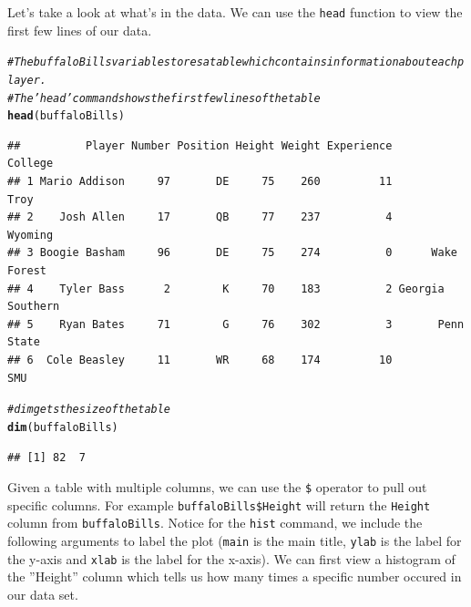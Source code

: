 \documentclass{article}\usepackage[]{graphicx}\usepackage[]{color}
\makeatletter
\newcommand{\hlcom}[1]{\textcolor[rgb]{0.678,0.584,0.686}{\textit{#1}}}%
\newcommand{\hlstd}[1]{\textcolor[rgb]{0.345,0.345,0.345}{#1}}%
\newcommand{\hlkwd}[1]{\textcolor[rgb]{0.737,0.353,0.396}{\textbf{#1}}}%
\newenvironment{kframe}{%
 \def\at@end@of@kframe{}%
 \ifinner\ifhmode%
  \def\at@end@of@kframe{\end{minipage}}%
  \begin{minipage}{\columnwidth}%
 \fi\fi%
 \def\FrameCommand##1{\hskip\@totalleftmargin \hskip-\fboxsep
 \colorbox{shadecolor}{##1}\hskip-\fboxsep
     \hskip-\linewidth \hskip-\@totalleftmargin \hskip\columnwidth}%
 \MakeFramed {\advance\hsize-\width
   \@totalleftmargin\z@ \linewidth\hsize
   \@setminipage}}%
 {\par\unskip\endMakeFramed%
 \at@end@of@kframe}
\newenvironment{knitrout}{}{} %
\makeatother
\begin{document}
Let's take a look at what's in the data. We can use the \texttt{head} function to view the first few lines of our data. 


\begin{knitrout}
\color{fgcolor}\begin{kframe}
\begin{alltt}
\hlcom{# The buffaloBills variable stores a table which contains information about each player.}
\hlcom{#The 'head' command shows the first few lines of the table}
\hlkwd{head}\hlstd{(buffaloBills)}
\end{alltt}
\begin{verbatim}
##          Player Number Position Height Weight Experience          College
## 1 Mario Addison     97       DE     75    260         11             Troy
## 2    Josh Allen     17       QB     77    237          4          Wyoming
## 3 Boogie Basham     96       DE     75    274          0      Wake Forest
## 4    Tyler Bass      2        K     70    183          2 Georgia Southern
## 5    Ryan Bates     71        G     76    302          3       Penn State
## 6  Cole Beasley     11       WR     68    174         10              SMU
\end{verbatim}
\begin{alltt}
\hlcom{# dim gets the size of the table}
\hlkwd{dim}\hlstd{(buffaloBills)}
\end{alltt}
\begin{verbatim}
## [1] 82  7
\end{verbatim}
\end{kframe}
\end{knitrout}

Given a table with multiple columns, we can use the \texttt{\$} operator to pull out specific columns. For example \texttt{buffaloBills\$Height} will return the \texttt{Height} column from \texttt{buffaloBills}. Notice for the \texttt{hist} command, we include the following arguments to label the plot (\texttt{main} is the main title, \texttt{ylab} is the label for the y-axis and \texttt{xlab} is the label for the x-axis). We can first view a histogram of the ''Height'' column which tells us how many times a specific number occured in our data set.
\end{document}
